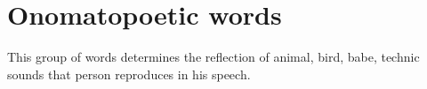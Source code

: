 \section{Onomatopoetic words}

This group of words determines the reflection of animal, bird, babe, technic sounds that person reproduces in his speech.